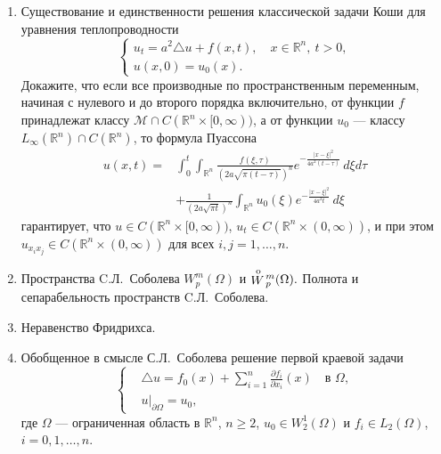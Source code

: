\documentclass[unicode,12pt,draft]{article}
\begin{document}
\begin{enumerate}
\item
Существование и единственности решения классической задачи Коши
для уравнения теплопроводности
$$
    \left\{
        \begin{array}{l}
            u_t = a^2 \triangle u + f (x, t),
            \quad
            x \in {\mathbb R}^n,
            \:
            t > 0,
            \\
            u (x, 0) = u_0 (x).
        \end{array}
    \right.
$$
Докажите, что если все производные по пространственным переменным,
начиная с нулевого и до второго порядка включительно, от функции
$f$ принадлежат классу ${\mathcal M} \cap C ({\mathbb R}^n \times
[0, \infty))$, а от функции $u_0$ --- классу $L_\infty ({\mathbb
R}^n) \cap C ({\mathbb R}^n)$, то формула Пуассона
\begin{align*}
    u (x, t)
    =
    {}
    &
    \int_0^t
    \int_{
        {\mathbb R}^n
    }
    \frac{
        f (\xi, \tau)
    }{
        (
            2
            a
            \sqrt {
                \pi
                (t - \tau)
            }
        )^n
    }
    e^{
        - \frac{
            |x - \xi|^2
        }{
            4
            a^2
            (t - \tau)
        }
    }
    \,
    d\xi
    d\tau
    \\
    &
    +
    \frac{
        1
    }{
        (
            2
            a
            \sqrt {
                \pi
                t
            }
        )^n
    }
    \int_{
        {\mathbb R}^n
    }
    u_0 (\xi)
    e^{
        - \frac{
            |x - \xi|^2
        }{
            4
            a^2
            t
        }
    }
    \,
    d\xi
\end{align*}
гарантирует, что $u \in C ({\mathbb R}^n \times [0, \infty))$,
$u_t \in C ({\mathbb R}^n \times (0, \infty))$, и при этом $u_{x_i
x_j} \in C ({\mathbb R}^n \times (0, \infty))$ для всех $i, j = 1,
\ldots, n$.

\item
Пространства C.Л.~Соболева $
    W_p^m
    (
        \Omega
    )
$ и $
    \stackrel{\rm o}{W}\!{}_p^m
    (
        \Omega
    ).
$ Полнота и сепарабельность пространств C.Л.~Соболева.

\item
Неравенство Фридрихса.

\item
Обобщенное в смысле С.Л.~Соболева решение первой краевой задачи
$$
    \left\{
        \begin{aligned}
            &
            \triangle u
            =
            f_0 (x)
            +
            \sum_{i = 1}^n
            \frac{\partial f_i}{\partial x_i}
            (x)
            \quad
            \mbox{в } \Omega,
            \\
            &
            \left.
                u
            \right|_{
                \partial \Omega
            }
            =
            u_0,
        \end{aligned}
    \right.
$$
где $\Omega$ --- ограниченная область в ${\mathbb R}^n$, $n \ge
2$, $
    u_0
    \in
    W_2^1
    (
        \Omega
    )
$ и $f_i \in L_2 (\Omega)$, $i = 0,1,\ldots,n$.


\end{enumerate}
\end{document}
